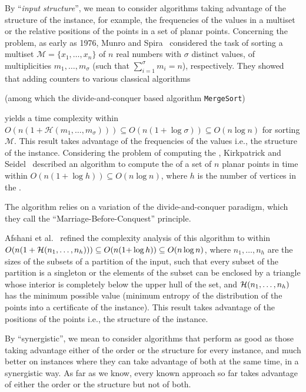 By ``\emph{input structure}'', we mean to consider algorithms taking
advantage of the structure of the instance, for example, the
frequencies of the values in a multiset or the relative positions of
the points in a set of planar points.
Concerning the {} problem, as early as 1976, Munro and
Spira~\cite{1976-JComp-SortingAndSearchingInMultisets-MunroSpira}
considered the task of sorting a multiset
$\mathcal{M}=\{x_1, \dots, x_n\}$ of $n$ real numbers with $\sigma$
distinct values, of multiplicities $m_1, \dots, m_\sigma$ (such that
$\sum_{i=1}^\sigma {m_i}=n$), respectively. They showed that adding
counters to various classical algorithms
\begin{INUTILE}
  (among which the divide-and-conquer based algorithm
  {\tt{MergeSort}})
\end{INUTILE}
yields a time complexity within
$O(n(1+\mathcal{H}(m_1, \dots, m_\sigma))) \subseteq
O(n(1{+}\log{\sigma})) \subseteq O(n\log{n})$ for sorting
$\mathcal{M}$. This result takes advantage of the frequencies of the
values i.e., the structure of the instance.
Considering the problem of computing the {},
Kirkpatrick and
Seidel~\cite{1986-JCom-TheUltimatePlanarConvexHullAlgorithm-KirkpatrickSeidel}
described an algorithm to compute the {} of a set of
$n$ planar points in time within $O(n(1+\log h))\subseteq O(n\log n)$,
where $h$ is the number of vertices in the {}.
\begin{INUTILE}
  The algorithm relies on a variation of the divide-and-conquer
  paradigm, which they call the ``Marriage-Before-Conquest''
  principle.
\end{INUTILE}
Afshani et
al.~\cite{2009-FOCS-InstanceOptimalGeometricAlgorithms-AfshaniBarbayChan}
refined the complexity analysis of this algorithm to within
$O(n(1+{\cal H}(n_1,\ldots,n_h)))\subseteq O(n(1{+}\log h)) \subseteq
O(n\log{n})$, where $n_1, \dots, n_h$ are the sizes of the subsets of
a partition of the input, such that every subset of the partition is a
singleton or the elements of the subset can be enclosed by a triangle
whose interior is completely below the upper hull of the set, and
${\cal H}(n_1,\ldots,n_h)$ has the minimum possible value (minimum
entropy of the distribution of the points into a certificate of the
instance). This result takes advantage of the positions of the points
i.e., the structure of the instance.

By ``synergistic'', we mean to consider algorithms that perform as
good as those taking advantage either of the order or the structure
for every instance, and much better on instances where they can take
advantage of both at the same time, in a synergistic way. As far as we
know, every known approach so far takes advantage of either the order or the
structure but not of both.

